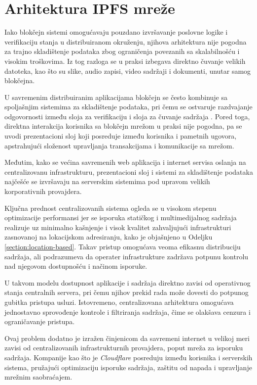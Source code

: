 \chapter{Arhitektura IPFS mreže}
Iako blokčejn sistemi omogućavaju pouzdano izvršavanje poslovne logike i verifikaciju stanja u distribuiranom okruženju, njihova arhitektura nije pogodna za trajno skladištenje podataka zbog ograničenja povezanih sa skalabilnošću i visokim troškovima. Iz tog razloga se u praksi izbegava direktno čuvanje velikih datoteka, kao što su slike, audio zapisi, video sadržaji i dokumenti, unutar samog blokčejna.

U savremenim distribuiranim aplikacijama blokčejn se često kombinuje sa spoljašnjim sistemima za skladištenje podataka, pri čemu se ostvaruje razdvajanje odgovornosti između sloja za verifikaciju i sloja za čuvanje sadržaja \cite{steichen2018blockchain}. Pored toga, direktna interakcija korisnika sa blokčejn mrežom u praksi nije pogodna, pa se uvodi prezentacioni sloj koji posreduje između korisnika i pametnih ugovora, apstrahujući složenost upravljanja transakcijama i komunikacije sa mrežom.

Međutim, kako se većina savremenih web aplikacija i internet servisa oslanja na centralizovanu infrastrukturu, prezentacioni sloj i sistemi za skladištenje podataka najčešće se izvršavaju na serverskim sistemima pod upravom velikih korporativnih provajdera.

Ključna prednost centralizovanih sistema ogleda se u visokom stepenu optimizacije performansi jer se isporuka statičkog i multimedijalnog sadržaja realizuje uz minimalno kašnjenje i visok kvalitet zahvaljujući infrastrukturi zasnovanoj na lokacijskom adresiranju, kako je objašnjeno u Odeljku \ref{section:location-based}. Takav pristup omogućava veoma efikasnu distribuciju sadržaja, ali podrazumeva da operater infrastrukture zadržava potpunu kontrolu nad njegovom dostupnošću i načinom isporuke.

U takvom modelu dostupnost aplikacije i sadržaja direktno zavisi od operativnog stanja centralnih servera, pri čemu njihov prekid rada može dovesti do potpunog gubitka pristupa usluzi. Istovremeno, centralizovana arhitektura omogućava jednostavno sprovođenje kontrole i filtriranja sadržaja, čime se olakšava cenzura i ograničavanje pristupa.

Ovaj problem dodatno je izražen činjenicom da savremeni internet u velikoj meri zavisi od centralizovanih infrastrukturnih provajdera, poput mreža za isporuku sadržaja. Kompanije kao što je \textit{Cloudflare} posreduju između korisnika i serverskih sistema, pružajući optimizaciju isporuke sadržaja, zaštitu od napada i upravljanje mrežnim saobraćajem.

